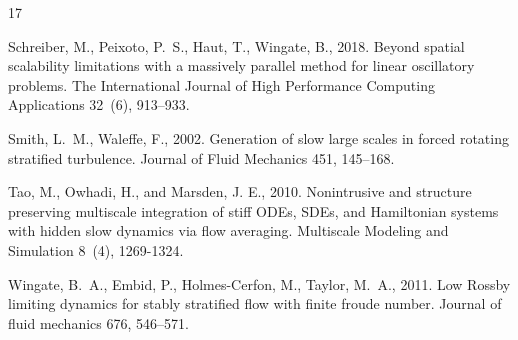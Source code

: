 \documentclass[a4,12pt]{article}
\renewenvironment{thebibliography}[1]{%
    \begin{oldthebibliography}{#1}%
    \setlength{\parskip}{0ex}%
    \setlength{\itemsep}{0ex}%
}%
                 {%
  \end{oldthebibliography}%
                 }
\begin{document}
\begin{thebibliography}{17}
Schreiber, M., Peixoto, P.~S., Haut, T., Wingate, B., 2018. Beyond spatial
  scalability limitations with a massively parallel method for linear
  oscillatory problems. The International Journal of High Performance Computing
  Applications 32~(6), 913--933.

Smith, L.~M., Waleffe, F., 2002. Generation of slow large scales in forced
  rotating stratified turbulence. Journal of Fluid Mechanics 451, 145--168.

Tao, M., Owhadi, H., and Marsden, J. E., 2010. Nonintrusive and structure preserving multiscale integration of stiff ODEs, SDEs, and Hamiltonian systems with hidden slow dynamics via flow averaging. Multiscale Modeling and Simulation 8~(4), 1269-1324.

Wingate, B.~A., Embid, P., Holmes-Cerfon, M., Taylor, M.~A., 2011. Low {R}ossby
  limiting dynamics for stably stratified flow with finite froude number.
  Journal of fluid mechanics 676, 546--571.

\end{thebibliography}
\end{document}
